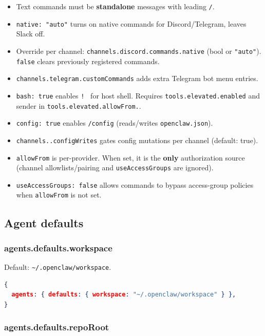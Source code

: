 \begin{itemize}
  \item Text commands must be \textbf{standalone} messages with leading \texttt{/}.
  \item \texttt{native: "auto"} turns on native commands for Discord/Telegram, leaves Slack off.
  \item Override per channel: \texttt{channels.discord.commands.native} (bool or \texttt{"auto"}). \texttt{false} clears previously registered commands.
  \item \texttt{channels.telegram.customCommands} adds extra Telegram bot menu entries.
  \item \texttt{bash: true} enables \texttt{! } for host shell. Requires \texttt{tools.elevated.enabled} and sender in \texttt{tools.elevated.allowFrom.}.
  \item \texttt{config: true} enables \texttt{/config} (reads/writes \texttt{openclaw.json}).
  \item \texttt{channels..configWrites} gates config mutations per channel (default: true).
  \item \texttt{allowFrom} is per-provider. When set, it is the \textbf{only} authorization source (channel allowlists/pairing and \texttt{useAccessGroups} are ignored).
  \item \texttt{useAccessGroups: false} allows commands to bypass access-group policies when \texttt{allowFrom} is not set.
\end{itemize}



\hrulefill


\subsection{Agent defaults}


\subsubsection{agents.defaults.workspace}


Default: \texttt{\textasciitilde{}/.openclaw/workspace}.

\begin{lstlisting}[language=json]
{
  agents: { defaults: { workspace: "~/.openclaw/workspace" } },
}
\end{lstlisting}


\subsubsection{agents.defaults.repoRoot}


